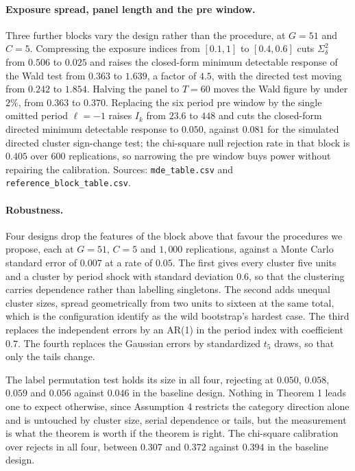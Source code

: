 \documentclass[12pt]{article}
\theoremstyle{definition}
\numberwithin{equation}{section}
\begin{document}
\paragraph{Exposure spread, panel length and the pre window.} Three further
blocks vary the design rather than the procedure, at $G = 51$ and $C = 5$.
Compressing the exposure indices from $[0.1,1]$ to $[0.4,0.6]$ cuts
$\Sigma_\delta^2$ from $0.506$ to $0.025$ and raises the closed-form minimum
detectable response of the Wald test from $0.363$ to $1.639$, a factor of
$4.5$, with the directed test moving from $0.242$ to $1.854$. Halving the panel
to $T = 60$ moves the Wald figure by under $2\%$, from $0.363$ to $0.370$.
Replacing the six period pre window by the single omitted period $\ell = -1$
raises $I_k$ from $23.6$ to $448$ and cuts the closed-form directed minimum
detectable response to $0.050$, against $0.081$ for the simulated directed
cluster sign-change test; the chi-square null rejection rate in that block is
$0.405$ over $600$ replications, so narrowing the pre window buys power without
repairing the calibration. Sources: \texttt{mde\_table.csv} and
\texttt{reference\_block\_table.csv}.

\paragraph{Robustness.} Four designs drop the features of the block above that
favour the procedures we propose, each at $G = 51$, $C = 5$ and $1{,}000$
replications, against a Monte Carlo standard error of $0.007$ at a rate of
$0.05$. The first gives every cluster five units and a cluster by period shock
with standard deviation $0.6$, so that the clustering carries dependence rather
than labelling singletons. The second adds unequal cluster sizes, spread
geometrically from two units to sixteen at the same total, which is the
configuration \citet{mackinnon2017wild} identify as the wild bootstrap's
hardest case. The third replaces the independent errors by an AR(1) in the
period index with coefficient $0.7$. The fourth replaces the Gaussian errors by
standardized $t_5$ draws, so that only the tails change.

The label permutation test holds its size in all four, rejecting at $0.050$,
$0.058$, $0.059$ and $0.056$ against $0.046$ in the baseline design. Nothing in
Theorem 1 leads one to expect otherwise, since Assumption
4 restricts the category direction alone and is untouched by cluster
size, serial dependence or tails, but the measurement is what the theorem is
worth if the theorem is right. The chi-square calibration over rejects in all
four, between $0.307$ and $0.372$ against $0.394$ in the baseline design.
\end{document}
